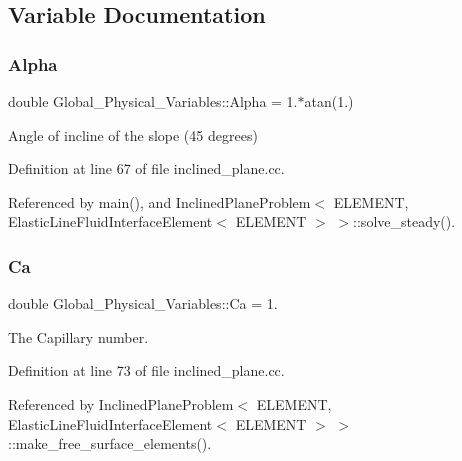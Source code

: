 \subsection{Variable Documentation}
\mbox{\label{namespaceGlobal__Physical__Variables_aa2e802ee7cc8e1ac900ba94c3ce86eb7}} 
\subsubsection{\texorpdfstring{Alpha}{Alpha}}
{\footnotesize\ttfamily double Global\+\_\+\+Physical\+\_\+\+Variables\+::\+Alpha = 1.$\ast$atan(1.)}



Angle of incline of the slope (45 degrees) 



Definition at line 67 of file inclined\+\_\+plane.\+cc.



Referenced by main(), and Inclined\+Plane\+Problem$<$ E\+L\+E\+M\+E\+N\+T, Elastic\+Line\+Fluid\+Interface\+Element$<$ E\+L\+E\+M\+E\+N\+T $>$ $>$\+::solve\+\_\+steady().

\mbox{\label{namespaceGlobal__Physical__Variables_a8b32b93d2e546f9375ec418474107838}} 
\subsubsection{\texorpdfstring{Ca}{Ca}}
{\footnotesize\ttfamily double Global\+\_\+\+Physical\+\_\+\+Variables\+::\+Ca = 1.}



The Capillary number. 



Definition at line 73 of file inclined\+\_\+plane.\+cc.



Referenced by Inclined\+Plane\+Problem$<$ E\+L\+E\+M\+E\+N\+T, Elastic\+Line\+Fluid\+Interface\+Element$<$ E\+L\+E\+M\+E\+N\+T $>$ $>$\+::make\+\_\+free\+\_\+surface\+\_\+elements().

